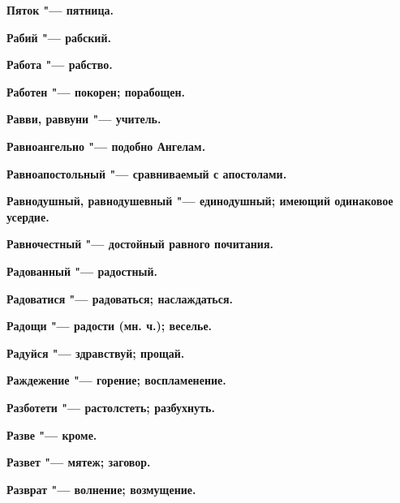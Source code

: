 \bfseries Пяток \normalfont{} "--- пятница. 




 





\bfseries Рабий \normalfont{} "--- рабский. 




\bfseries Работа \normalfont{} "--- рабство. 




\bfseries Работен \normalfont{} "--- покорен; порабощен. 




\bfseries Равви, раввуни \normalfont{} "--- учитель. 




\bfseries Равноангельно \normalfont{} "--- подобно Ангелам. 




\bfseries Равноапостольный \normalfont{} "--- сравниваемый с апостолами. 




\bfseries Равнодушный, равнодушевный \normalfont{} "--- единодушный; имеющий одинаковое усердие. 




\bfseries Равночестный \normalfont{} "--- достойный равного почитания. 




\bfseries Радованный \normalfont{} "--- радостный. 




\bfseries Радоватися \normalfont{} "--- радоваться; наслаждаться. 




\bfseries Радощи \normalfont{} "--- радости (мн. ч.); веселье. 




\bfseries Радуйся \normalfont{} "--- здравствуй; прощай. 




\bfseries Раждежение \normalfont{} "--- горение; воспламенение. 




\bfseries Разботети \normalfont{} "--- растолстеть; разбухнуть. 




\bfseries Разве \normalfont{} "--- кроме. 




\bfseries Развет \normalfont{} "--- мятеж; заговор. 




\bfseries Разврат \normalfont{} "--- волнение; возмущение. 




